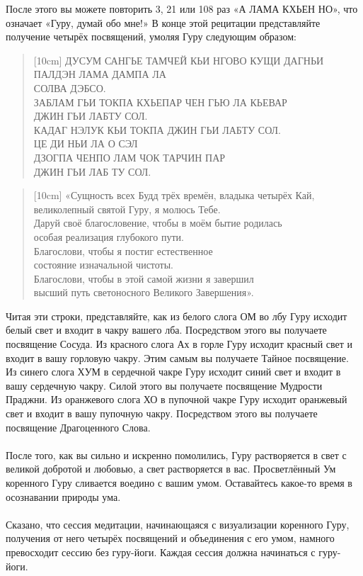 \newpage
После этого вы можете повторить 3, 21 или 108 раз «А ЛАМА КХЬЕН НО»,
что означает «Гуру, думай обо мне!» В конце этой рецитации представляйте
получение четырёх посвящений, умоляя Гуру следующим образом:
\begin{verse}[10cm]
\small
ДУСУМ САНГЬЕ ТАМЧЕЙ КЬИ НГОВО КУЩИ ДАГНЬИ \\
ПАЛДЭН ЛАМА ДАМПА ЛА \\
СОЛВА ДЭБСО.\\
ЗАБЛАМ ГЬИ ТОКПА КХЬЕПАР ЧЕН ГЬЮ ЛА КЬЕВАР \\
ДЖИН ГЬИ ЛАБТУ СОЛ.\\
КАДАГ НЭЛУК КЬИ ТОКПА ДЖИН ГЬИ ЛАБТУ СОЛ.\\
ЦЕ ДИ НЬИ ЛА О СЭЛ \\
ДЗОГПА ЧЕНПО ЛАМ ЧОК ТАРЧИН ПАР \\
ДЖИН ГЬИ ЛАБ ТУ СОЛ.
\end{verse}
\normalsize
\begin{verse}[10cm]
«Сущность всех Будд трёх времён, владыка четырёх Кай, \\ \indent великолепный святой Гуру, я молюсь Тебе.\\
Даруй своё благословение, чтобы в моём бытие родилась \\ \indent особая реализация глубокого пути.\\
Благослови, чтобы я постиг естественное \\ \indent состояние изначальной чистоты.\\
Благослови, чтобы в этой самой жизни я завершил \\ \indent высший путь светоносного Великого Завершения».
\end{verse}
Читая эти строки, представляйте, как из белого слога ОМ во лбу Гуру исходит белый свет и входит в чакру вашего лба. Посредством этого вы получаете посвящение Сосуда. Из красного слога Ах в горле Гуру исходит красный свет и входит в вашу горловую чакру. Этим самым вы получаете Тайное посвящение. Из синего слога ХУМ в сердечной чакре Гуру исходит синий свет и входит в вашу сердечную чакру. Силой этого вы получаете посвящение Мудрости Праджни. Из оранжевого слога ХО в пупочной чакре Гуру исходит оранжевый свет и входит в вашу пупочную чакру. Посредством этого вы получаете посвящение Драгоценного Слова.
\\ \\ После того, как вы сильно и искренно помолились, Гуру растворяется в свет с великой добротой и любовью, а свет растворяется в вас. Просветлённый Ум коренного Гуру сливается воедино с вашим умом. Оставайтесь какое-то время в осознавании природы ума.
\\ \\ Сказано, что сессия медитации, начинающаяся с визуализации коренного Гуру, получения от него четырёх посвящений и объединения с его умом, намного превосходит сессию без гуру-йоги. Каждая сессия должна начинаться с гуру-йоги.
